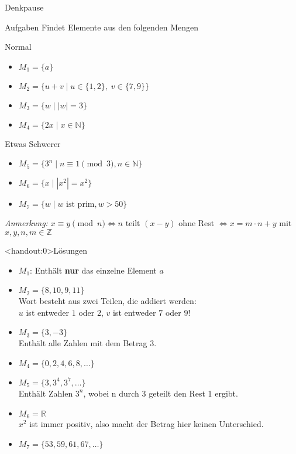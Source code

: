 {
\begin{frame}[fragile]{Denkpause}
    \footnotesize
    \begin{alertblock}{Aufgaben}
        Findet Elemente aus den folgenden Mengen
    \end{alertblock}
    \begin{block}{Normal}
        \begin{itemize}
            \item $M_1 = \{a\}$
            \item $M_2 = \{u+v \mid u\in\{1,2\},\;v\in\{7,9\}\}$
            \item $M_3 = \{w \mid |w| = 3\}$
            \item $M_4 = \{2x \mid x\in \mathbb N\}$
        \end{itemize}
    \end{block}
    \begin{block}{Etwas Schwerer}
        \begin{itemize}
            \item $M_5 = \{3^n \mid n \equiv 1 \pmod 3, n\in\mathbb{N}\}$
            \item $M_6 = \{x \mid |x^2| = x^2\}$
            \item $M_7 = \{w \mid w \text{ ist prim}, w > 50\}$
        \end{itemize}
    \end{block}
    \emph{Anmerkung:} $x \equiv y \pmod n \iff n$ teilt $(x-y)$ ohne Rest $\iff x = m \cdot n + y$ mit $x,y,n,m \in \mathbb{Z}$
\end{frame}
}

{
\begin{frame}<handout:0>{Lösungen}
    \begin{itemize}[<+- | alert@+>]
        \item
              $M_1$: Enthält \textbf{nur} das einzelne Element $a$
        \item
              $M_2 = \{8, 10, 9, 11\}$\\
              Wort besteht aus zwei Teilen, die addiert werden:\\ $u$ ist entweder $1$ oder $2$, $v$ ist entweder $7$ oder $9$!
        \item
              $M_3 = \{3, -3\}$\\
              Enthält alle Zahlen mit dem Betrag $3$.
        \item $M_4 = \{0, 2, 4, 6, 8, \dots \}$
        \item $M_5 = \{3, 3^4, 3^7, \dots\}$\\
              Enthält Zahlen $3^n$, wobei n durch 3 geteilt den Rest 1 ergibt.
        \item
              $M_6 = \mathbb{R}$\\
              $x^2$ ist immer positiv, also macht der Betrag hier keinen Unterschied.
        \item
              $M_7 = \{53, 59, 61, 67, \dots\}$
    \end{itemize}
\end{frame}
}

